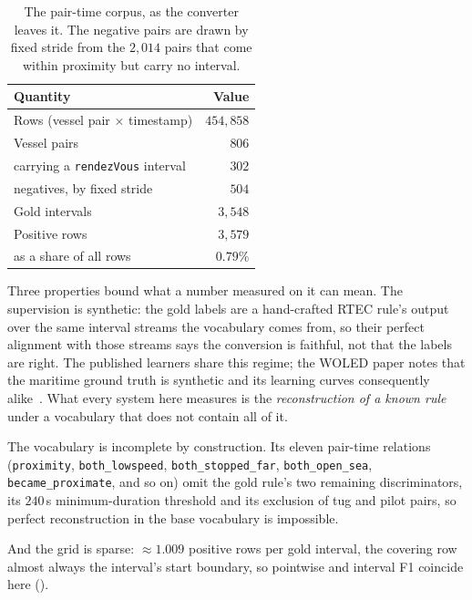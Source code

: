 \begin{table}[htbp]
  \centering
  \caption{The pair-time corpus, as the converter leaves it. The negative pairs are drawn by fixed stride from the $2{,}014$ pairs that come within proximity but carry no interval.}
  \label{tab:maritime-corpus}
  \small
  \begin{tabularx}{\columnwidth}{@{}Lr@{}}
    \toprule
    \textbf{Quantity} & \textbf{Value} \\
    \midrule
    Rows (vessel pair $\times$ timestamp)          & $454{,}858$ \\
    Vessel pairs                                   & $806$ \\
    \quad carrying a \texttt{rendezVous} interval  & $302$ \\
    \quad negatives, by fixed stride               & $504$ \\
    Gold intervals                                 & $3{,}548$ \\
    Positive rows                                  & $3{,}579$ \\
    \quad as a share of all rows                   & $0.79\%$ \\
    \bottomrule
  \end{tabularx}
\end{table}

Three properties bound what a number measured on it can mean. The supervision is synthetic: the gold labels are a hand-crafted RTEC rule's output over the same interval streams the vocabulary comes from, so their perfect alignment with those streams says the conversion is faithful, not that the labels are right. The published learners share this regime; the WOLED paper notes that the maritime ground truth is synthetic and its learning curves consequently alike~\cite{woled}. What every system here measures is the \emph{reconstruction of a known rule} under a vocabulary that does not contain all of it.

The vocabulary is incomplete by construction. Its eleven pair-time relations (\texttt{proximity}, \texttt{both\_lowspeed}, \texttt{both\_stopped\_far}, \texttt{both\_open\_sea}, \texttt{became\_proximate}, and so on) omit the gold rule's two remaining discriminators, its $240$\,s minimum-duration threshold and its exclusion of tug and pilot pairs, so perfect reconstruction in the base vocabulary is impossible.

And the grid is sparse: ${\approx}1.009$ positive rows per gold interval, the covering row almost always the interval's start boundary, so pointwise and interval F1 coincide here ().

